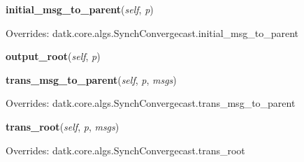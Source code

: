     \vspace{0.5ex}

\hspace{.8\funcindent}\begin{boxedminipage}{\funcwidth}

    \raggedright \textbf{initial\_msg\_to\_parent}(\textit{self}, \textit{p})

\setlength{\parskip}{2ex}
\setlength{\parskip}{1ex}
      Overrides: datk.core.algs.SynchConvergecast.initial\_msg\_to\_parent

    \end{boxedminipage}

    \label{datk:core:algs:SynchConvergeHeight:output_root}

    \vspace{0.5ex}

\hspace{.8\funcindent}\begin{boxedminipage}{\funcwidth}

    \raggedright \textbf{output\_root}(\textit{self}, \textit{p})

\setlength{\parskip}{2ex}
\setlength{\parskip}{1ex}
    \end{boxedminipage}

    \vspace{0.5ex}

\hspace{.8\funcindent}\begin{boxedminipage}{\funcwidth}

    \raggedright \textbf{trans\_msg\_to\_parent}(\textit{self}, \textit{p}, \textit{msgs})

\setlength{\parskip}{2ex}
\setlength{\parskip}{1ex}
      Overrides: datk.core.algs.SynchConvergecast.trans\_msg\_to\_parent

    \end{boxedminipage}

    \vspace{0.5ex}

\hspace{.8\funcindent}\begin{boxedminipage}{\funcwidth}

    \raggedright \textbf{trans\_root}(\textit{self}, \textit{p}, \textit{msgs})

\setlength{\parskip}{2ex}
\setlength{\parskip}{1ex}
      Overrides: datk.core.algs.SynchConvergecast.trans\_root

    \end{boxedminipage}


